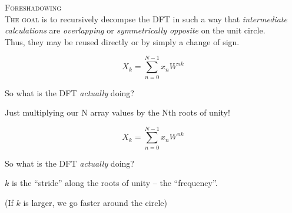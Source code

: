 \documentclass[14pt]{beamer}
\begin{document}
\begin{frame}
    \begin{center}
        \textsc{Foreshadowing}\\[.5em]
        \scriptsize{\textsc{The goal} is to recursively decompse the DFT in such a way that {\em intermediate calculations}
        are {\em overlapping} or {\em symmetrically opposite} on the unit circle.}\\[1em]

        \tiny{Thus, they may be reused directly or by simply a change of sign.}
    \end{center}
\end{frame}

\begin{frame}
    \begin{equation*}
        X_k = \sum_{n=0}^{N-1} x_n W^{nk}
    \end{equation*}

    \centering
    So what is the DFT \textit{actually} doing?\\[1em]

    \pause

    \begin{figure}
        \centering
        
        
    \end{figure}

    \scriptsize{Just multiplying our N array values by the Nth roots of unity!}
\end{frame}

\begin{frame}
    \begin{equation*}
        X_k = \sum_{n=0}^{N-1} x_n W^{nk}
    \end{equation*}

    \centering
    So what is the DFT \textit{actually} doing?\\[1em]

    \begin{figure}
        \centering
        
        
    \end{figure}

    \scriptsize{$k$ is the ``stride'' along the roots of unity -- the ``frequency''.}

    \tiny{(If $k$ is larger, we go faster around the circle)}
\end{frame}
\end{document}
